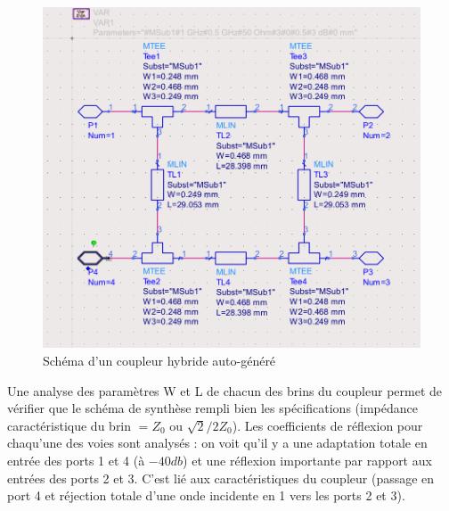 \documentclass[a4paper]{article}
\begin{document}
\begin{figure}[!htb]
\begin{center}
  \includegraphics[scale=0.30]{Coupleur-Hybride-Synthese.png}
  \caption{Sch\'ema d'un coupleur hybride auto-g\'en\'er\'e}
  \label{Coupleur-Hybride-Synthese}
\end{center}
\end{figure}

Une analyse des param\`etres W et L de chacun des brins du coupleur permet de v\'erifier que le sch\'ema
de synth\`ese rempli bien les sp\'ecifications (imp\'edance caract\'eristique du brin $= Z_0$ ou $ \sqrt{2}/2 Z_0$).
Les coefficients de r\'eflexion pour chaqu'une des voies sont analys\'es : on voit qu'il y a une adaptation totale
en entr\'ee des ports 1 et 4 (\`a $-40 db$) et une r\'eflexion importante par rapport aux entr\'ees des ports 2 et 3.
C'est li\'e aux caract\'eristiques du coupleur (passage en port 4 et r\'ejection totale d'une onde incidente en 1 vers les
ports 2 et 3).
\end{document}

